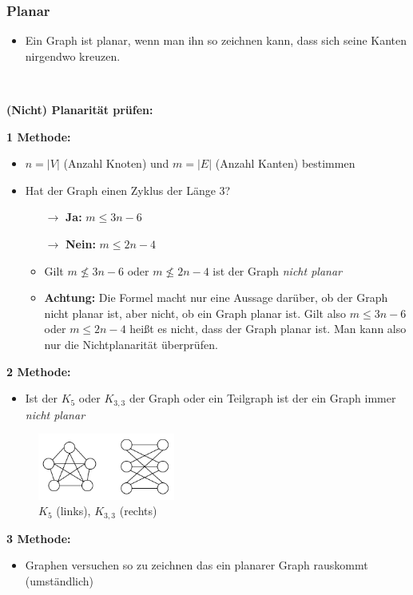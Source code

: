 \newpage

\subsubsection*{Planar}

\begin{itemize}
\item Ein Graph ist planar, wenn man ihn so zeichnen kann, dass sich seine Kanten nirgendwo kreuzen.
\end{itemize}\

\textbf{(Nicht) Planarität prüfen:}

\textbf{1 Methode:}

\begin{itemize}
\item $n = |V|$ (Anzahl Knoten) und $m = |E|$ (Anzahl Kanten) bestimmen
\item Hat der Graph einen Zyklus der Länge 3?
	\begin{itemize}
	\item[$\rightarrow$] \textbf{Ja:} $m \leq 3n - 6$
	\item[$\rightarrow$] \textbf{Nein:} $m \leq 2n - 4$
	\item Gilt $m \not \leq 3n - 6$ oder $m \not \leq 2n - 4$ ist der Graph \textit{nicht planar}
	\item \textbf{Achtung:} Die Formel macht nur eine Aussage darüber, ob der Graph nicht planar ist, aber nicht, ob ein Graph planar ist. Gilt also $m \leq 3n - 6$ oder $m \leq 2n - 4$ heißt es nicht, dass der Graph planar ist. Man kann also nur die Nichtplanarität überprüfen.
	\end{itemize}
\end{itemize}

\textbf{2 Methode:}

\begin{itemize}
\item Ist der $K_5$ oder $K_{3,3}$ der Graph oder ein Teilgraph ist der ein Graph immer \textit{nicht planar}
\end{itemize}

\begin{figure}[h]
\centering
\includegraphics[width=0.4\textwidth]{graphics/graph_planar.png}
\caption*{$K_5$ (links), $K_{3,3}$ (rechts)}
\end{figure}

\textbf{3 Methode:}

\begin{itemize}
\item Graphen versuchen so zu zeichnen das ein planarer Graph rauskommt (umständlich)
\end{itemize}